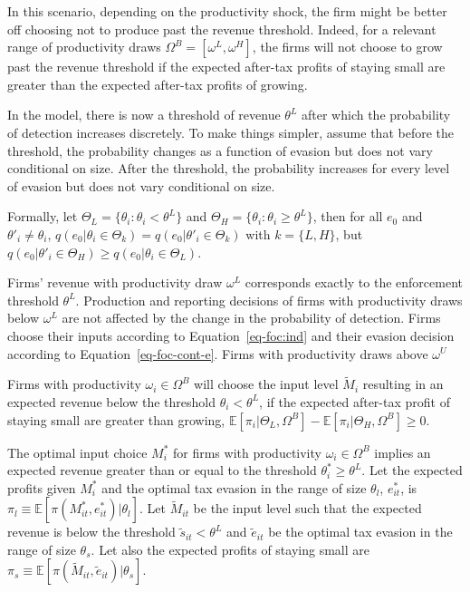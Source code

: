 \documentclass[
  12pt]{article}
\theoremstyle{definition}
\theoremstyle{remark}
\begin{document}
In this scenario, depending on the productivity shock, the firm might be
better off choosing not to produce past the revenue threshold. Indeed,
for a relevant range of productivity draws
\(\Omega^B=[\omega^L, \omega^H]\), the firms will not choose to grow
past the revenue threshold if the expected after-tax profits of staying
small are greater than the expected after-tax profits of growing.

In the model, there is now a threshold of revenue \(\theta^L\) after
which the probability of detection increases discretely. To make things
simpler, assume that before the threshold, the probability changes as a
function of evasion but does not vary conditional on size. After the
threshold, the probability increases for every level of evasion but does
not vary conditional on size.

Formally, let \(\Theta_{L} = \{\theta_i : \theta_{i} < \theta^L \}\) and
\(\Theta_{H} = \{\theta_i : \theta_{i} \ge \theta^L \}\), then for all
\(e_0\) and \(\theta'_i\not=\theta_i\),
\(q(e_0|\theta_i \in \Theta_k)=q(e_0|\theta'_i \in \Theta_k)\) with
\(k=\{L,H\}\), but
\(q(e_0|\theta'_i \in \Theta_H)\ge q(e_0|\theta_i \in \Theta_L)\).

Firms' revenue with productivity draw \(\omega^L\) corresponds exactly
to the enforcement threshold \(\theta^L\). Production and reporting
decisions of firms with productivity draws below \(\omega^L\) are not
affected by the change in the probability of detection. Firms choose
their inputs according to Equation~\ref{eq-foc:ind} and their evasion
decision according to Equation~\ref{eq-foc-cont-e}. Firms with
productivity draws above \(\omega^U\)

Firms with productivity \(\omega_{i}\in \Omega^B\) will choose the input
level \(\tilde{M}_{i}\) resulting in an expected revenue below the
threshold \(\theta_{i}<\theta^L\), if the expected after-tax profit of
staying small are greater than growing,
\(\mathbb{E}[\pi_{i}|\Theta_L, \Omega^B]-\mathbb{E}[\pi_{i}|\Theta_H, \Omega^B]\ge0\).

The optimal input choice \(M^*_{i}\) for firms with productivity
\(\omega_i\in\Omega^B\) implies an expected revenue greater than or
equal to the threshold \(\theta^*_{i}\ge \theta^L\). Let the expected
profits given \(M^*_{i}\) and the optimal tax evasion in the range of
size \(\theta_l\), \(e^*_{it}\), is
\(\pi_l\equiv\mathbb{E}[\pi(M^*_{it}, e^*_{it})|\theta_l]\). Let
\(\tilde{M}_{it}\) be the input level such that the expected revenue is
below the threshold \(\tilde{s}_{it}<\theta^L\) and \(\tilde{e}_{it}\)
be the optimal tax evasion in the range of size \(\theta_s\). Let also
the expected profits of staying small are
\(\pi_s\equiv\mathbb{E}[\pi(\tilde{M}_{it},\tilde{e}_{it})|\theta_s]\).
\end{document}
